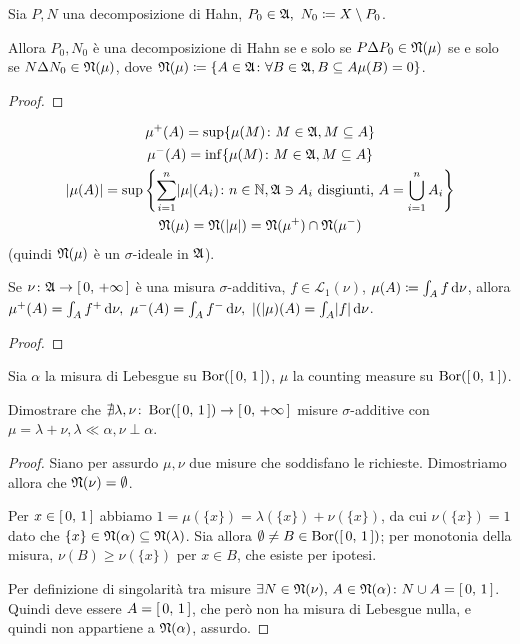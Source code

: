 \documentclass[../EserciziIstituzioniAnalisi.tex]{subfiles}
\begin{document}
\begin{exercise}
  Sia $P,N$ una decomposizione di Hahn, $P_0\in\gA,\ N_0\coloneqq X\setminus P_0$.

  Allora $P_0,N_0$ è una decomposizione di Hahn se e solo se $P\Delta P_0\in\mathfrak N(\mu)$ se e solo se $N\Delta N_0\in\mathfrak N(\mu)$, dove $\mathfrak N(\mu)\coloneqq\{A\in\mathfrak A\colon \forall B\in \mathfrak A, B\subseteq A \mu(B)=0\}$.
\end{exercise}
\begin{proof}
  
\end{proof}
\begin{exercise}
  \begin{gather*}
    \mu^+(A)=\sup\{\mu(M)\colon M\in \mathfrak A, M\subseteq A\}\\
    \mu^-(A)=\inf\{\mu(M)\colon M\in \mathfrak A, M\subseteq A\}\\
    \lvert\mu(A)\rvert=\sup\left\{\sum_{i=1}^n\lvert\mu\rvert(A_i)\colon n\in \mathbb N, \mathfrak A\ni A_i \text{ disgiunti, }A=\bigcup_{i=1}^{n}A_i\right\}\\
    \mathfrak N(\mu)=\mathfrak N(\lvert\mu\rvert)=\mathfrak N(\mu^+)\cap\mathfrak N(\mu^-)
  \end{gather*}
  (quindi $\mathfrak N(\mu)$ è un $\sigma$-ideale in  $\mathfrak A$).
  
  Se $\nu\colon \mathfrak A\to\left[\,0,\,+\infty\,\right]$ è una misura $\sigma$-additiva, $f\in\mathcal{L}_1(\nu)$, $\mu(A)\coloneqq\int_Af\,\mathrm d\nu$,
  allora $\mu^+(A)=\int_Af^+\de \nu,\ \mu^-(A)=\int_Af^-\de\nu,\ \abs(\mu)(A)=\int_A\abs{f}\de\nu$.
\end{exercise}
\begin{proof}
  
\end{proof}
\begin{exercise}
  Sia $\alpha$ la misura di Lebesgue su $\operatorname{Bor}(\left[\,0,\,1\,\right])$, $\mu$ la counting measure su $\operatorname{Bor}(\left[\,0,\,1\,\right])$.
  
  Dimostrare che $\nexists\lambda,\nu\colon\operatorname{Bor}(\left[\,0,\,1\,\right])\to \left[\,0,\,+\infty\,\right]$ misure $\sigma$-additive con $\mu=\lambda+\nu, \lambda \ll \alpha, \nu \perp \alpha$.
\end{exercise}
\begin{proof}
  Siano per assurdo $\mu, \nu$ due misure che soddisfano le richieste.
  Dimostriamo allora che $\mathfrak N(\nu)=\emptyset$.

  Per $x\in\left[\,0,\,1\,\right]$ abbiamo $1=\mu(\{x\})=\lambda(\{x\})+\nu(\{x\})$, da cui $\nu(\{x\})=1$ dato che $\{x\}\in\mathfrak N(\alpha)\subseteq\mathfrak N(\lambda)$.
  Sia allora $\emptyset\neq B\in\operatorname{Bor}(\left[\,0,\,1\,\right])$; per monotonia della misura, $\nu(B)\geq\nu(\{x\})$ per $x\in B$, che esiste per ipotesi.

  Per definizione di singolarità tra misure $\exists N\in\mathfrak N(\nu),\, A\in\mathfrak N(\alpha)\colon N\cup A=\left[\,0,\,1\,\right]$. Quindi deve essere $A=\left[\,0,\,1\,\right]$, che però non ha misura di Lebesgue nulla, e quindi non appartiene a $\mathfrak N(\alpha)$, assurdo.
\end{proof}
\end{document}
